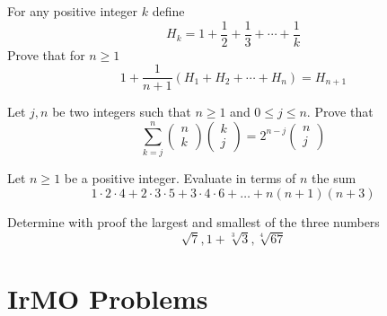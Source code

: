 \documentclass{pset}
\begin{document}
\begin{problems}
\begin{problem}
    For any positive integer \(k\) define
    $$
    H_{k}=1+\frac{1}{2}+\frac{1}{3}+\cdots+\frac{1}{k}
    $$
    Prove that for \(n \geq 1\)
    $$
    1+\frac{1}{n+1}\left(H_{1}+H_{2}+\cdots+H_{n}\right)=H_{n+1}
    $$
\end{problem}

\begin{problem}
    Let \(j, n\) be two integers such that \(n \geq 1\) and \(0 \leq j \leq n .\) Prove that
    $$
    \sum_{k=j}^{n}\left(\begin{array}{l}
    {n} \\
    {k}
    \end{array}\right)\left(\begin{array}{l}
    {k} \\
    {j}
    \end{array}\right)=2^{n-j}\left(\begin{array}{l}
    {n} \\
    {j}
    \end{array}\right)
    $$
\end{problem}

\begin{problem}
    Let \(n \geq 1\) be a positive integer. Evaluate in terms of \(n\) the sum
    $$
    1 \cdot 2 \cdot 4+2 \cdot 3 \cdot 5+3 \cdot 4 \cdot 6+\ldots+n(n+1)(n+3)
    $$
\end{problem}

\begin{problem}
    Determine with proof the largest and smallest of the three numbers
    $$
    \sqrt{7}, 1+\sqrt[3]{3}, \sqrt[4]{67}
    $$
\end{problem}



\end{problems}


\clearpage

\section*{IrMO Problems}
\end{document}

